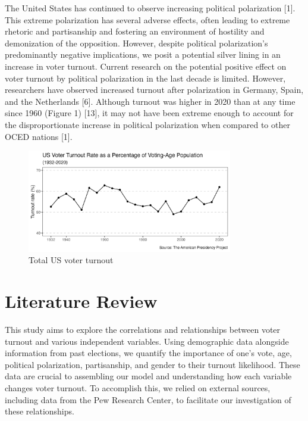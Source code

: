 \documentclass[titlepage, 12pt, leqno]{article} %
\begin{document}
The United States has continued to observe increasing political polarization 
[1]. This extreme polarization has several adverse effects, often leading to
extreme rhetoric and partisanship and fostering an environment of hostility and
demonization of the opposition. However, despite political polarization's
predominantly negative implications, we posit a potential silver lining in an
increase in voter turnout. Current research on the potential positive effect on
voter turnout by political polarization in the last decade is limited. However,
researchers have observed increased turnout after polarization in Germany, 
Spain, and the Netherlands [6]. Although turnout was higher in 2020 than at any
time since 1960 (Figure 1) [13], it may not have been extreme enough to account
for the disproportionate increase in political polarization when compared to
other OCED nations [1].

\begin{figure}[ht]
    \centering
    \includegraphics[width = 0.8\textwidth]{../plots/us_turnout.png}
    \caption{Total US voter turnout}
    \label{fig:label}
\end{figure}

\pagebreak
\section{Literature Review}
This study aims to explore the correlations and relationships between voter
turnout and various independent variables. Using demographic data alongside
information from past elections, we quantify the importance of one's vote, age,
political polarization, partisanship, and gender to their turnout likelihood.
These data are crucial to assembling our model and understanding how each
variable changes voter turnout. To accomplish this, we relied on external
sources, including data from the Pew Research Center, to facilitate our
investigation of these relationships.
\end{document}
